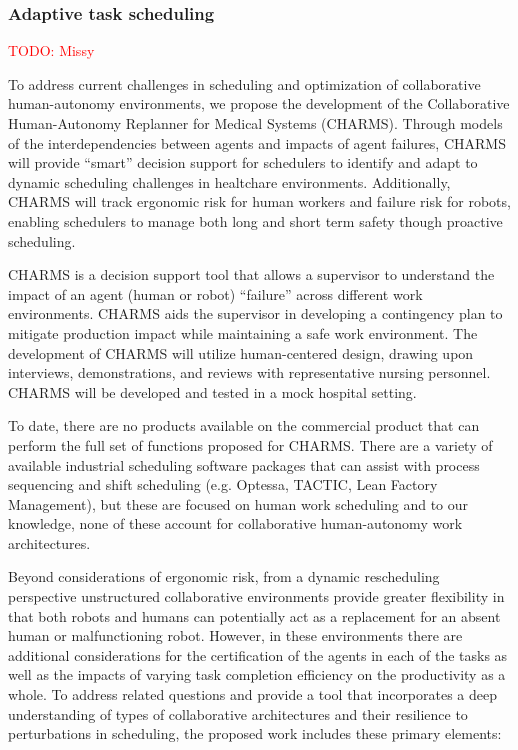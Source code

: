 \subsubsection{Adaptive task scheduling}
\textcolor{red}{TODO: Missy}

To address current challenges in scheduling and optimization of collaborative human-autonomy environments, we propose the development of the Collaborative Human-Autonomy Replanner for Medical Systems (CHARMS). Through models of the interdependencies between agents and impacts of agent failures, CHARMS will provide ``smart'' decision support for schedulers to identify and adapt to dynamic scheduling challenges in healtchare environments. Additionally, CHARMS will track ergonomic risk for human workers and failure risk for robots, enabling schedulers to manage both long and short term safety though proactive scheduling. 

CHARMS is a decision support tool that allows a supervisor to understand the impact of an agent (human or robot) ``failure'' across different work environments. CHARMS aids the supervisor in developing a contingency plan to mitigate production impact while maintaining a safe work environment. The development of CHARMS will utilize human-centered design, drawing upon interviews, demonstrations, and reviews with representative nursing personnel. CHARMS will be developed and tested in a mock hospital setting.

To date, there are no products available on the commercial product that can perform the full set of functions proposed for CHARMS. There are a variety of available industrial scheduling software packages that can assist with process sequencing and shift scheduling (e.g. Optessa, TACTIC, Lean Factory Management), but these are focused on human work scheduling and to our knowledge, none of these account for collaborative human-autonomy work architectures. 

Beyond considerations of ergonomic risk, from a dynamic rescheduling perspective unstructured collaborative environments provide greater flexibility in that both robots and humans can potentially act as a replacement for an absent human or malfunctioning robot. However, in these environments there are additional considerations for the certification of the agents in each of the tasks as well as the impacts of varying task completion efficiency on the productivity as a whole. To address related questions and provide a tool that incorporates a deep understanding of types of collaborative architectures and their resilience to perturbations in scheduling, the proposed work includes these primary elements:

